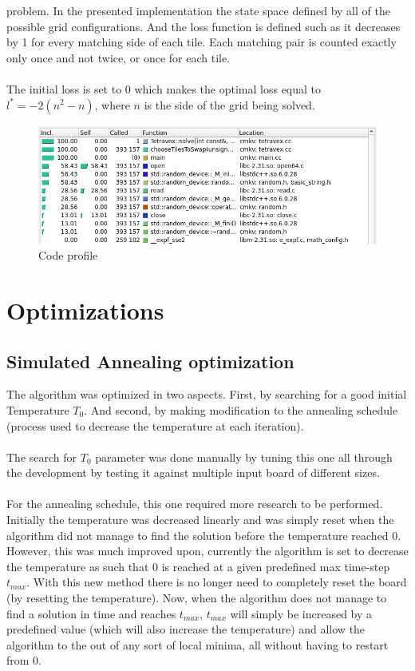 \documentclass[11pt]{article}
\begin{document}
\begin{multicols*}{2}
problem. In the presented implementation the state space defined by all of the
possible grid configurations. And the loss function is defined such as it
decreases by 1 for every matching side of each tile. Each matching pair is
counted exactly only once and not twice, or once for each tile.\\\\ The initial
loss is set to 0 which makes the optimal loss equal to $l^* = -2(n^2-n)$, where
$n$ is the side of the grid being solved.
\begin{figure}[t]
  \centering
  \includegraphics[scale=0.5]{image/error.png}
  \caption{Code profile}
  \label{fig:callgrind}
\end{figure}
\section{Optimizations}
\subsection{Simulated Annealing optimization}
The algorithm was optimized in two aspects. First, by searching for a good
initial Temperature $T_0$. And second, by making modification to the annealing
schedule (process used to decrease the temperature at each iteration).\\\\ The
search for $T_0$ parameter was done manually by tuning this one all through the
development by testing it against multiple input board of different
sizes.\\\\ For the annealing schedule, this one required more research to be
performed. Initially the temperature was decreased linearly and was simply reset
when the algorithm did not manage to find the solution before the temperature
reached 0. However, this was much improved upon, currently the algorithm is set
to decrease the temperature as such that 0 is reached at a given predefined max
time-step $t_{max}$. With this new method there is no longer need to completely
reset the board (by resetting the temperature). Now, when the algorithm does not
manage to find a solution in time and reaches $t_{max}$, $t_{max}$ will simply
be increased by a predefined value (which will also increase the temperature)
and allow the algorithm to the out of any sort of local minima, all without
having to restart from 0.

\end{multicols*}
\end{document}
